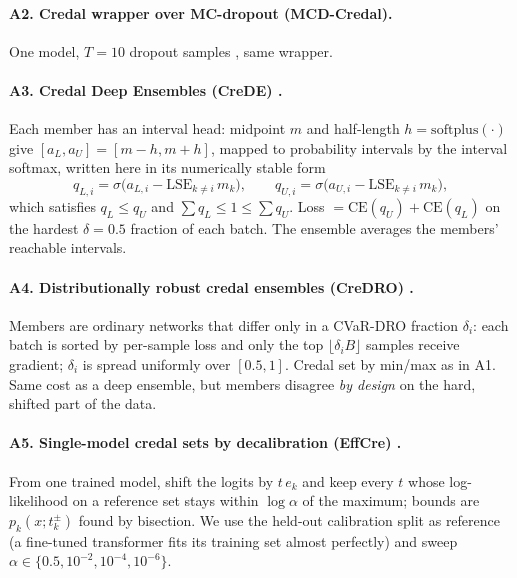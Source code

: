 \documentclass[11pt,a4paper]{article}
\begin{document}
\paragraph{A2. Credal wrapper over MC-dropout (MCD-Credal).} One model, $T=10$ dropout samples \cite{gal2016}, same wrapper.

\paragraph{A3. Credal Deep Ensembles (CreDE) \cite{wang2024crede}.}
Each member has an interval head: midpoint $m$ and half-length $h=\mathrm{softplus}(\cdot)$ give $[a_L,a_U]=[m-h,m+h]$, mapped to probability intervals by the interval softmax, written here in its numerically stable form
\begin{equation}
q_{L,i}=\sigma\!\big(a_{L,i}-\mathrm{LSE}_{k\ne i}\,m_k\big),\qquad q_{U,i}=\sigma\!\big(a_{U,i}-\mathrm{LSE}_{k\ne i}\,m_k\big),
\end{equation}
which satisfies $q_L\le q_U$ and $\sum q_L\le1\le\sum q_U$. Loss $=\mathrm{CE}(q_U)+\mathrm{CE}(q_L)$ on the hardest $\delta=0.5$ fraction of each batch. The ensemble averages the members' reachable intervals.

\paragraph{A4. Distributionally robust credal ensembles (CreDRO) \cite{credro2026}.}
Members are ordinary networks that differ only in a CVaR-DRO fraction $\delta_i$: each batch is sorted by per-sample loss and only the top $\lfloor\delta_i B\rfloor$ samples receive gradient; $\delta_i$ is spread uniformly over $[0.5,1]$. Credal set by min/max as in A1. Same cost as a deep ensemble, but members disagree \emph{by design} on the hard, shifted part of the data.

\paragraph{A5. Single-model credal sets by decalibration (EffCre) \cite{hofman2026,lohr2025}.}
From one trained model, shift the logits by $t\,e_k$ and keep every $t$ whose log-likelihood on a reference set stays within $\log\alpha$ of the maximum; bounds are $p_k(x;t_k^{\pm})$ found by bisection. We use the held-out calibration split as reference (a fine-tuned transformer fits its training set almost perfectly) and sweep $\alpha\in\{0.5,10^{-2},10^{-4},10^{-6}\}$.
\end{document}

